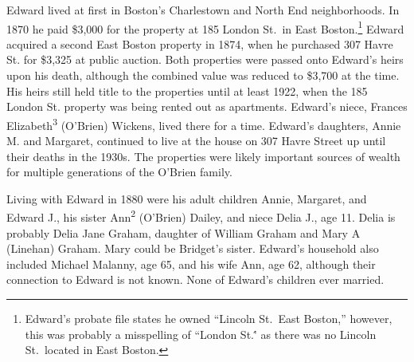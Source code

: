 Edward lived at first in Boston's Charlestown\cite{MaryAnn3OBrienBirth:1} and North End\cite{Edward3OBrienBirth:1} neighborhoods. In 1870 he paid \$3,000 for the property at 185 London St.\ in East Boston.\footnote{Edward's probate file states he owned ``Lincoln St.\  East Boston,'' however, this was probably a misspelling of ``London St.\'' as there was no Lincoln St.\ located in East Boston.\cite{LondonStDeed:2}} Edward acquired a second East Boston property in 1874, when he purchased 307 Havre St. for \$3,325 at public auction.\cite{HavrePurchase} Both properties were passed onto Edward's heirs upon his death, although the combined value was reduced to \$3,700 at the time.\cite{Edward2OBrienProbate} His heirs still held title to the properties until at least 1922,\cite{Bromley1922} when the 185 London St. property was being rented out as apartments.\cite{GlobeRobbery} Edward's niece, Frances Elizabeth\textsuperscript{3} (O'Brien) Wickens, lived there for a time.\cite{Frances3OBrien1914} Edward's daughters, Annie M. and Margaret, continued to live at the house on 307 Havre Street up until their deaths in the 1930s.\cite{AnnMaria3OBrienDeath:1} The properties were likely important sources of wealth for multiple generations of the O'Brien family.

Living with Edward in 1880 were his adult children Annie, Margaret, and Edward J., his sister Ann\textsuperscript{2} (O'Brien) Dailey, and niece Delia J., age 11.\cite{Census1880Edward:2} Delia is probably Delia Jane Graham, daughter of William Graham and Mary A (Linehan) Graham.\cite{DeliaGrahamBirth} Mary could be Bridget's sister. Edward's household also included Michael Malanny, age 65, and his wife Ann, age 62, although their connection to Edward is not known.\cite{Census1880Edward:3} None of Edward's children ever married. 

